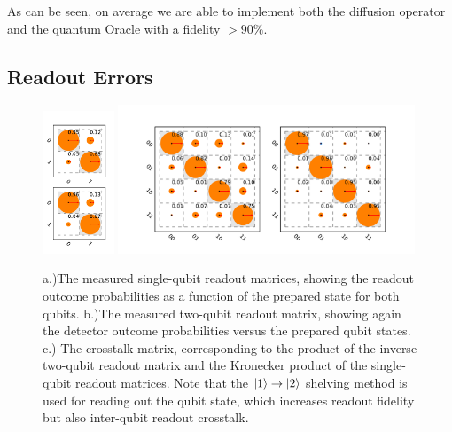 As can be seen, on average we are able to implement both the diffusion operator and the quantum Oracle with a fidelity $>90\%$.
\subsection{Readout Errors}

\begin{figure}[ht!]
	\centering
\includegraphics[width=0.19\textwidth]{"./data/ct5/2011_04_21 - grover and tomo/good_data/single qubit readouts"}
\includegraphics[width=0.79\textwidth]{"./data/ct5/2011_04_21 - grover and tomo/good_data/readout and crosstalk - 2 plots"}
	\caption[Measured single- and two-qubit readout matrices and crosstalk matrix for the Grover search algorithm experiment]{a.)The measured single-qubit readout matrices, showing the readout outcome probabilities as a function of the prepared state for both qubits. b.)The measured two-qubit readout matrix, showing again the detector outcome probabilities versus the prepared qubit states. c.) The crosstalk matrix, corresponding to the product of the inverse two-qubit readout matrix and the Kronecker product of the single-qubit readout matrices. Note that the $\left| 1 \right>\to\left| 2 \right>$ shelving method is used for reading out the qubit state, which increases readout fidelity but also inter-qubit readout crosstalk.}
	\label{fig:GroverReadoutMatrix}
\end{figure}

